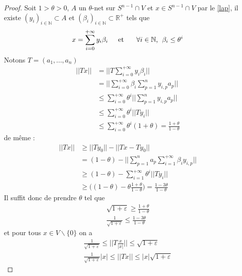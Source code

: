 \documentclass[12pt]{article}
\theoremstyle{definition}
\begin{document}
\begin{proof} 
	Soit $1>\theta>0$, $A$ un $\theta$-net sur $S^{n-1}\cap V$ et $x\in S^{n-1}\cap V$ par le \cref{lap},  il existe $(y_i)_{i\in\mathbb{N}}\subset A$ et $(\beta_i)_{i\in\mathbb{N}}\subset \mathbb{R}^{+}$ tels que 
	\begin{equation*}
	x = \sum_{i=0}^{+\infty}y_i \beta_i \text{\hspace{4mm} et \hspace{4mm} $\forall i\in \mathbb{N}$, }\; \beta_i\leq \theta^i
	\end{equation*}
	Notons $T=(a_1,...,a_n)$
	\begin{align*}
	||Tx|| &= \big|\big| T\sum_{i=0}^{+\infty}y_i \beta_i\big|\big|\\
	&=  \big|\big| \sum_{i=0}^{+\infty}\beta_i \sum_{p=1}^{n}y_{i,p}a_p \big|\big|\\
	&\leq \sum_{i=0}^{+\infty}\theta^i ||\sum_{p=1}^{n}y_{i,p}a_p||\\
	&\leq \sum_{i=0}^{+\infty}\theta^i ||Ty_i||\\
	& \leq  \sum_{i=0}^{+\infty}\theta^i (1+\theta)=\frac{1+\theta}{1-\theta}
	\end{align*}
	de même :
	\begin{align*}
	||Tx|| &\geq||Ty_0||- ||Tx-Ty_0||\\
	&= (1-\theta) - ||\sum_{p=1}^{n}a_p\sum_{i=1}^{+\infty}\beta_i y_{i,p}||\\
	&\geq (1-\theta)- \sum_{i=1}^{+\infty}\theta^i ||Ty_i||\\
	&\geq \big((1-\theta)- \theta\frac{1+\theta}{1-\theta}\big)=  \frac{1-3\theta}{1-\theta}
	\end{align*}
	Il suffit donc de prendre $\theta$ tel que
	\begin{equation*}
	\begin{array}{cc}
	\sqrt{1+\varepsilon}\geq \frac{1+\theta}{1-\theta}\\
	\frac{1}{\sqrt{1+\varepsilon}}\leq \frac{1-3\theta}{1-\theta}
	\end{array}
	\end{equation*}
	et pour tous $x\in V \backslash\{0\}$ on a 
	\begin{equation*}
	\begin{array}{cc}
	\frac{1}{\sqrt{1+\varepsilon}}\leq\big|\big|T\frac{x}{|x|}\big|\big|\leq  \sqrt{1+\varepsilon}\\
	\frac{1}{\sqrt{1+\varepsilon}}|x|\leq||Tx||\leq |x|\sqrt{1+\varepsilon}
	\end{array}
	\end{equation*}

\end{proof}
\end{document}
